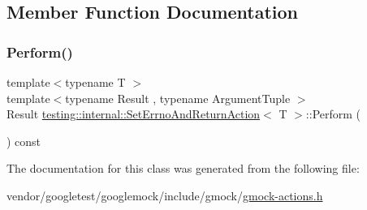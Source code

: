 \subsection{Member Function Documentation}
\mbox{\label{classtesting_1_1internal_1_1_set_errno_and_return_action_a44025d0d124cab72878bf6bdb12c3693}} 
\subsubsection{\texorpdfstring{Perform()}{Perform()}}
{\footnotesize\ttfamily template$<$typename T $>$ \\
template$<$typename Result , typename Argument\+Tuple $>$ \\
Result \hyperlink{classtesting_1_1internal_1_1_set_errno_and_return_action}{testing\+::internal\+::\+Set\+Errno\+And\+Return\+Action}$<$ T $>$\+::Perform (\begin{DoxyParamCaption}\item[{const Argument\+Tuple \&}]{ }\end{DoxyParamCaption}) const\hspace{0.3cm}{\ttfamily [inline]}}



The documentation for this class was generated from the following file\+:\begin{DoxyCompactItemize}
\item 
vendor/googletest/googlemock/include/gmock/\hyperlink{gmock-actions_8h}{gmock-\/actions.\+h}\end{DoxyCompactItemize}
